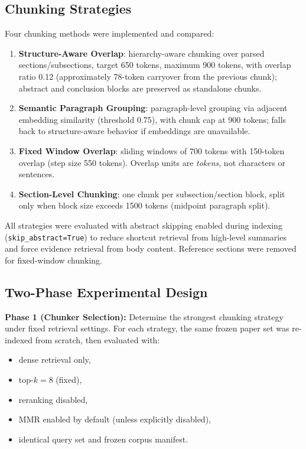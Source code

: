 \documentclass[a4paper,12pt]{article}
\begin{document}
\subsection{Chunking Strategies}

Four chunking methods were implemented and compared:

\begin{enumerate}
    \item \textbf{Structure-Aware Overlap}: hierarchy-aware chunking over parsed sections/subsections, target 650 tokens, maximum 900 tokens, with overlap ratio 0.12 (approximately 78-token carryover from the previous chunk); abstract and conclusion blocks are preserved as standalone chunks.
    \item \textbf{Semantic Paragraph Grouping}: paragraph-level grouping via adjacent embedding similarity (threshold 0.75), with chunk cap at 900 tokens; falls back to structure-aware behavior if embeddings are unavailable.
    \item \textbf{Fixed Window Overlap}: sliding windows of 700 tokens with 150-token overlap (step size 550 tokens). Overlap units are \textit{tokens}, not characters or sentences.
    \item \textbf{Section-Level Chunking}: one chunk per subsection/section block, split only when block size exceeds 1500 tokens (midpoint paragraph split).
\end{enumerate}

All strategies were evaluated with abstract skipping enabled during indexing (\texttt{skip\_abstract=True}) to reduce shortcut retrieval from high-level summaries and force evidence retrieval from body content. Reference sections were removed for fixed-window chunking.

\subsection{Two-Phase Experimental Design}

\textbf{Phase 1 (Chunker Selection):} Determine the strongest chunking strategy under fixed retrieval settings. For each strategy, the same frozen paper set was re-indexed from scratch, then evaluated with:
\begin{itemize}
    \item dense retrieval only,
    \item top-$k=8$ (fixed),
    \item reranking disabled,
    \item MMR enabled by default (unless explicitly disabled),
    \item identical query set and frozen corpus manifest.
\end{itemize}
\end{document}
